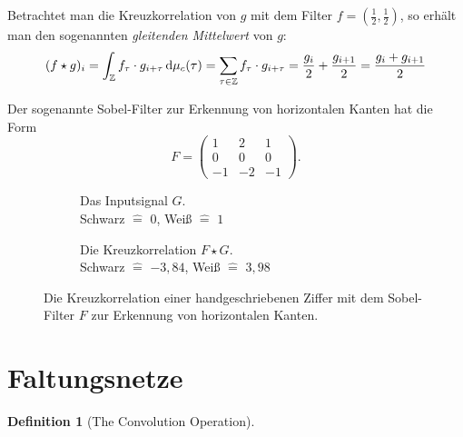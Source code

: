 \documentclass{article}
\theoremstyle{definition}
\newtheorem{definition}[theorem]{Definition}
\newcommand{\Z}{\mathbb{Z}}
\newcommand{\diff}{\,\textrm{d}}
\begin{document}
Betrachtet man die Kreuzkorrelation von $g$ mit dem Filter $f=(\frac{1}{2}, \frac{1}{2})$, so erhält man den sogenannten \emph{gleitenden Mittelwert} von $g$:
\[
    (f \star g)_i = \int_\Z f_\tau \cdot g_{i + \tau} \diff \cmeasure(\tau) 
    = \sum_{\tau\in\Z} f_\tau \cdot g_{i+ \tau}
    = \frac{g_i}{2} + \frac{g_{i+1}}{2} = \frac{g_i + g_{i+1}}{2}
\]

Der sogenannte Sobel-Filter zur Erkennung von horizontalen Kanten hat die Form
\[
    F = \begin{pmatrix}
        1 & 2 & 1 \\
        0 & 0 & 0 \\ 
        -1 & -2 & -1
    \end{pmatrix}.
\]




\begin{figure}
    \begin{subfigure}[c]{0.5\textwidth}
        \resizebox{\textwidth}{\textwidth}{
        
        }
        \captionsetup{justification=centering}
        \caption{Das Inputsignal $G$.\\Schwarz $\hat=$ $0$, Weiß $\hat=$ $1$}
    \end{subfigure}%
    \begin{subfigure}[c]{0.5\textwidth}
        \resizebox{\textwidth}{\textwidth}{
        
        }
    \captionsetup{justification=centering}
    \caption{Die Kreuzkorrelation $F\star G$.\\Schwarz $\hat=$ $-3{,}84$, Weiß $\hat=$ $3{,}98$}
    \end{subfigure}
    \caption{Die Kreuzkorrelation einer handgeschriebenen Ziffer mit dem Sobel-Filter $F$ zur Erkennung von horizontalen Kanten.}
\end{figure}




\section{Faltungsnetze}





\begin{definition}[The Convolution Operation]
    
\end{definition}

\clearpage          %
\thispagestyle{empty}

\end{document}
